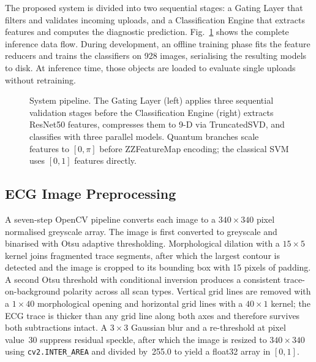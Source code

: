 \documentclass[10pt,conference]{IEEEtran}
\begin{document}
The proposed system is divided into two sequential stages: a Gating
Layer that filters and validates incoming uploads, and a Classification
Engine that extracts features and computes the diagnostic prediction.
Fig.~\ref{fig:pipeline} shows the complete inference data flow. During
development, an offline training phase fits the feature reducers and
trains the classifiers on 928 images, serialising the resulting models
to disk. At inference time, those objects are loaded to evaluate single
uploads without retraining.

\begin{figure}[t]
  \centering
  \caption{System pipeline. The Gating Layer (left) applies three
    sequential validation stages before the Classification Engine
    (right) extracts ResNet50 features, compresses them to 9-D via
    TruncatedSVD, and classifies with three parallel models. Quantum
    branches scale features to $[0,\pi]$ before ZZFeatureMap encoding;
    the classical SVM uses $[0,1]$ features directly.}
  \label{fig:pipeline}
\end{figure}

\subsection{ECG Image Preprocessing}

A seven-step OpenCV pipeline converts each image to a
$340\!\times\!340$ pixel normalised greyscale array. The image is first
converted to greyscale and binarised with Otsu adaptive thresholding.
Morphological dilation with a $15\!\times\!5$ kernel joins fragmented
trace segments, after which the largest contour is detected and the
image is cropped to its bounding box with 15 pixels of padding. A
second Otsu threshold with conditional inversion produces a consistent
trace-on-background polarity across all scan types. Vertical grid lines
are removed with a $1\!\times\!40$ morphological opening and horizontal
grid lines with a $40\!\times\!1$ kernel; the ECG trace is thicker than
any grid line along both axes and therefore survives both subtractions
intact. A $3\!\times\!3$ Gaussian blur and a re-threshold at pixel
value~30 suppress residual speckle, after which the image is resized to
$340\!\times\!340$ using \texttt{cv2.INTER\_AREA} and divided by~255.0
to yield a float32 array in $[0,1]$.
\end{document}
